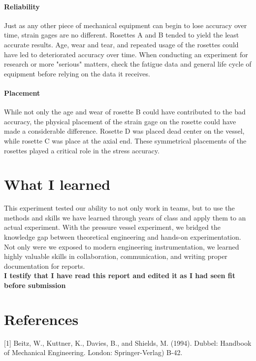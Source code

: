 \documentclass[12pt]{article}
\begin{document}
\paragraph{Reliability} Just as any other piece of mechanical equipment can begin to lose accuracy over time, strain gages are no different. Rosettes A and B tended to yield the least accurate results. Age, wear and tear, and repeated usage of the rosettes could have led to deteriorated accuracy over time. When conducting an experiment for research or more "serious" matters, check the fatigue data and general life cycle of equipment before relying on the data it receives. 

\paragraph{Placement} While not only the age and wear of rosette B could have contributed to the bad accuracy, the physical placement of the strain gage on the rosette could have made a considerable difference. Rosette D was placed dead center on the vessel, while rosette C was place at the axial end. These symmetrical placements of the rosettes played a critical role in the stress accuracy. 

\newpage
\section{What I learned}
This experiment tested our ability to not only work in teams, but to use the methods and skills we have learned through years of  class and apply them to an actual experiment. With the pressure vessel experiment, we bridged the knowledge gap between theoretical engineering and hands-on experimentation. Not only were we exposed to modern engineering instrumentation, we learned highly valuable skills in collaboration, communication, and writing proper documentation for reports. \\ 

\textbf{I testify that I have read this report and edited it as I had seen fit before submission} 


\newpage
\section {References}
[1] Beitz, W., Kuttner, K., Davies, B., and Shields, M. (1994). 
Dubbel: Handbook of Mechanical Engineering. London: Springer-Verlag) B-42. \\ 
\end{document}
